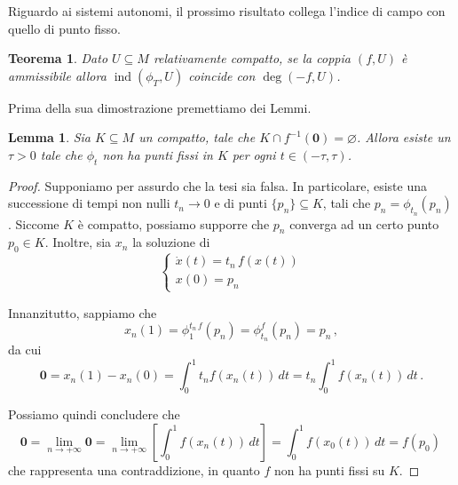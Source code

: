 \documentclass[a4paper, 11pt]{article}
\theoremstyle{definition}
\theoremstyle{plain}
\newtheorem{Lemma}[Def]{Lemma}
\newtheorem{Teo}[Def]{Teorema}
\newcommand{\zero}{\mathbf{0}}
\newcommand{\eset}{\varnothing}
\DeclareMathOperator{\ind}{ind}
\begin{document}
Riguardo ai sistemi autonomi, il prossimo risultato collega l'indice di campo con quello di punto fisso.
\begin{Teo}\label{teo:degind}
	Dato $U \subseteq M$ relativamente compatto, se la coppia $(f,U)$ è ammissibile allora $\ind(\phi_T, U)$ coincide con $\deg(-f, U)$.
\end{Teo}
Prima della sua dimostrazione premettiamo dei Lemmi.
\begin{Lemma}\label{Lemma:flowfissi}
	Sia $K \subseteq M$ un compatto, tale che $K \cap f^{-1}(\zero) = \eset$. Allora esiste un $\tau >0 $ tale che $\phi_t$ non ha punti fissi in $K$ per ogni $t \in (-\tau, \tau)$.
\end{Lemma}
\begin{proof}
	Supponiamo per assurdo che la tesi sia falsa. In particolare, esiste una successione di tempi non nulli $t_n \to 0$ e di punti $\{p_n\} \subseteq K$, tali che $p_n = \phi_{t_n}(p_n)$. Siccome $K$ è compatto, possiamo supporre che $p_n$ converga ad un certo punto $p_0 \in K$. Inoltre, sia $x_n$ la soluzione di 
	\[
		\begin{cases}
			\dot{x}(t) = t_n\,f(x(t))\\
			x(0) = p_n
		\end{cases}
	\]
	
	Innanzitutto, sappiamo che
	\[
		x_n(1) = \phi_1^{t_n\,f}(p_n) = \phi_{t_n}^{f}(p_n) = p_n\,,
	\]
	da cui
	\[
		\zero = x_n(1) - x_n(0) = \int_0^1t_nf (x_n(t))\,dt = t_n\int_0^1f(x_n(t))\,dt\,.
	\]
	
	Possiamo quindi concludere che
	\[
		\zero = \lim_{n\to+\infty}\zero = \lim_{n \to +\infty}\left[\int_0^1f(x_n(t))\,dt \right] = \int_0^1f(x_0(t))\,dt = f(p_0)\,
	\]
	che rappresenta una contraddizione, in quanto $f$ non ha punti fissi su $K$.
\end{proof}
\end{document}
